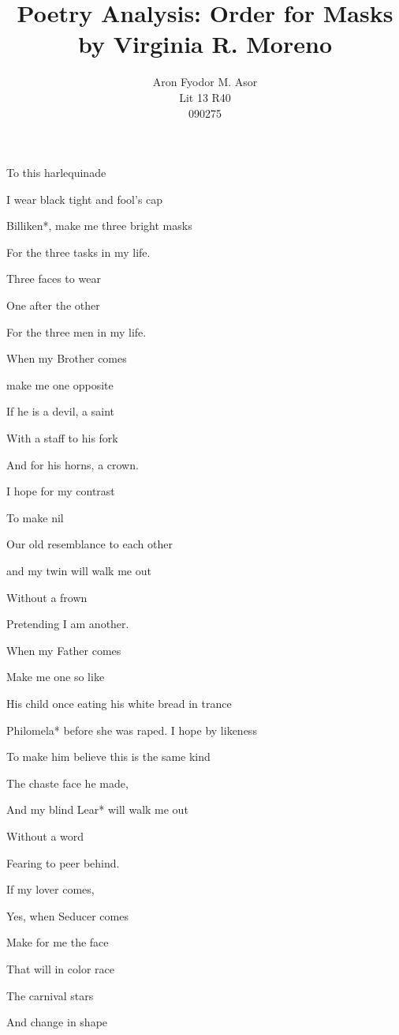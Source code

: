 \documentclass{slides}
\begin{document}
\title{Poetry Analysis: Order for Masks by Virginia R. Moreno}
\author{Aron Fyodor M. Asor\\
	Lit 13 R40\\
	090275}
\maketitle
	To this harlequinade

	I wear black tight and fool's cap

	Billiken*, make me three bright masks

	For the three tasks in my life.

	Three faces to wear

	One after the other

	For the three men in my life.

	When my Brother comes

	make me one opposite

	If he is a devil, a saint

	With a staff to his fork

	And for his horns, a crown.

	I hope for my contrast

	To make nil

	Our old resemblance to each other

	and my twin will walk me out

	Without a frown

	Pretending I am another.

	When my Father comes

	Make me one so like

	His child once eating his white bread in trance

	Philomela* before she was raped. I hope by likeness

	To make him believe this is the same kind

	The chaste face he made,

	And my blind Lear* will walk me out

	Without a word

	Fearing to peer behind.

	If my lover comes,

	Yes, when Seducer comes

	Make for me the face

	That will in color race

	The carnival stars

	And change in shape
\end{document}
